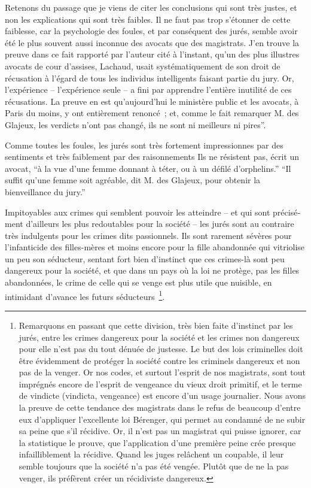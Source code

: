 \documentclass[french,twoside]{book} %
\begin{document}
Retenons du passage que je viens de citer les conclusions qui sont très justes, et non les explications qui sont très faibles. Il ne faut pas trop s’étonner de cette faiblesse, car la psychologie des foules, et par conséquent des jurés, semble avoir été le plus souvent aussi inconnue des avocats que des magistrats. J’en trouve la preuve dans ce fait rapporté par l’auteur cité à l’instant, qu’un des plus illustres avocats de cour d’assises, Lachaud, usait systématiquement de son droit de récusation à l’égard de tous les individus intelligents faisant partie du jury. Or, l’expérience – l’expérience seule – a fini par apprendre l’entière inutilité de ces récusations. La preuve en est qu’aujourd’hui le ministère public et les avocats, à Paris du moins, y ont entièrement renoncé ; et, comme le fait remarquer M. des Glajeux, les verdicts n’ont pas changé, ils ne sont ni meilleurs ni pires”.\par
Comme toutes les foules, les jurés sont très fortement impressionnes par des sentiments et très faiblement par des raisonnements Ils ne résistent pas, écrit un avocat, “à la vue d’une femme donnant à téter, ou à un défilé d’orphelins.” “Il suffit qu’une femme soit agréable, dit M. des Glajeux, pour obtenir la bienveillance du jury.”\par
Impitoyables aux crimes qui semblent pouvoir les atteindre – et qui sont précisé­ment d’ailleurs les plus redoutables pour la société – les jurés sont au contraire très indulgents pour les crimes dits passionnels. Ils sont rarement sévères pour l’infanti­cide des filles-mères et moins encore pour la fille abandonnée qui vitriolise un peu son séducteur, sentant fort bien d’instinct que ces crimes-là sont peu dangereux pour la société, et que dans un pays où la loi ne protège, pas les filles abandonnées, le crime de celle qui se venge est plus utile que nuisible, en intimidant d’avance les futurs séducteurs \footnote{Remarquons en passant que cette division, très bien faite d’instinct par les jurés, entre les crimes dangereux pour la société et les crimes non dangereux pour elle n’est pas du tout dénuée de justesse. Le but des lois criminelles doit être évidemment de protéger la société contre les criminels dangereux et non pas de la venger. Or nos codes, et surtout l’esprit de nos magistrats, sont tout imprégnés encore de l’esprit de vengeance du vieux droit primitif, et le terme de vindicte (vindicta, vengeance) est encore d’un usage journalier. Nous avons la preuve de cette tendance des magis­trats dans le refus de beaucoup d’entre eux d’appliquer l’excellente loi Bérenger, qui permet au condamné de ne subir sa peine que s’il récidive. Or, il n’est pas un magistrat qui puisse ignorer, car la statistique le prouve, que l’application d’une première peine crée presque infailliblement la récidive. Quand les juges relâchent un coupable, il leur semble toujours que la société n’a pas été vengée. Plutôt que de ne la pas venger, ils préfèrent créer un récidiviste dangereux.}.\par
\end{document}
